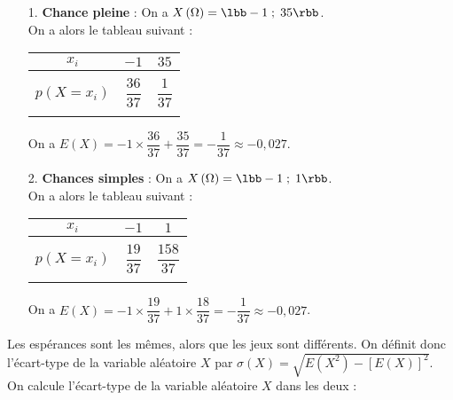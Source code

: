 \begin{itemize}
\item[1.] \textbf{Chance pleine} : On a $X\left(\Omega\right) = \lbb -1 \; ; \; 35 \rbb$. \\

On a alors le tableau suivant : \\

\begin{tabular}{c|c|c}
$x_i$ & $-1$ & $35$ \\
\hline
& \\
$p\left(X = x_i\right)$ & $\dfrac{36}{37}$ & $\dfrac{1}{37}$ \\
& \\
\end{tabular}

\vspace*{.3cm}

On a $E\left(X\right) = -1 \times \dfrac{36}{37} + \dfrac{35}{37} = -\dfrac{1}{37} \approx -0,027$. \\

\item[2.] \textbf{Chances simples} : On a $X\left(\Omega\right) = \lbb -1 \; ; \; 1 \rbb$. \\

On a alors le tableau suivant : \\

\begin{tabular}{c|c|c}
$x_i$ & $-1$ & $1$ \\
\hline
& \\
$p\left(X = x_i\right)$ & $\dfrac{19}{37}$ & $\dfrac{158}{37}$ \\
& \\
\end{tabular}

\vspace*{.3cm}

On a $E\left(X\right) = -1 \times \dfrac{19}{37} + 1 \times \dfrac{18}{37} = -\dfrac{1}{37} \approx -0,027$. 
\end{itemize}

\vspace*{-10cm}

\newpage

Les espérances sont les mêmes, alors que les jeux sont différents. On définit donc l'écart-type de la variable aléatoire $X$ par $\sigma\left(X\right) = \sqrt{E\left(X^2\right) - \left[E\left(X\right)\right]^2}$. \\

On calcule l'écart-type de la variable aléatoire $X$ dans les deux : \\

